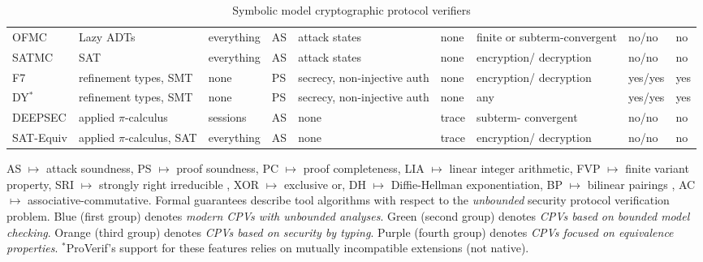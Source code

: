 \begin{table}[h!]
\begin{tabular}{|p{1.3cm}|p{1.8cm}p{1.3cm}p{1.5cm}p{1.4cm}p{.8cm}p{1.9cm}p{1cm}p{1.6cm}|}
\rowcolor{grouptwoLight}
OFMC \cite{ofmc} & Lazy ADTs & everything & AS & attack states & none & finite or subterm-convergent & no/no & no \\

\rowcolor{grouptwoDark}
SATMC \cite{satmc} & SAT & everything & AS & attack states & none & encryption/ decryption & no/no & no \\
\hhline{|=========|}

\rowcolor{groupthreeDark}
F7 \cite{f7} & refinement types, SMT & none & PS & secrecy, non-injective auth & none & encryption/ decryption & yes/yes & yes \\

\rowcolor{groupthreeLight}
DY$^*$ \cite{dystar} & refinement types, SMT & none & PS & secrecy, non-injective auth & none & any & yes/yes & yes \\
\hhline{|=========|}

\rowcolor{groupfourDark}
DEEPSEC \cite{deepsec} & applied \newline$\pi$-calculus & sessions & AS & none & trace & subterm- \newline convergent & no/no & no \\

\rowcolor{groupfourLight}
SAT-Equiv \cite{sat_equiv} & applied \newline$\pi$-calculus, SAT & everything & AS & none & trace & encryption/ decryption & no/no & no \\

\hline
\end{tabular}
\begin{flushleft}
\vspace{.3em}
AS $\mapsto$ attack soundness, PS $\mapsto$ proof soundness, PC $\mapsto$ proof completeness, LIA $\mapsto$ linear integer arithmetic,
FVP $\mapsto$ finite variant property, SRI $\mapsto$ strongly right irreducible \cite{rewrite_systems}, XOR $\mapsto$ exclusive or, DH $\mapsto$ Diffie-Hellman exponentiation, BP $\mapsto$ bilinear pairings \cite{bilinear}, AC $\mapsto$ associative-commutative.
\newline\newline 
Formal guarantees describe tool algorithms with respect to the \emph{unbounded} security protocol verification problem. 
\newline\newline
Blue (first group) denotes \emph{modern CPVs with unbounded analyses}. Green (second group) denotes \emph{CPVs based on bounded model checking}. Orange (third group) denotes \emph{CPVs based on security by typing}. Purple (fourth group) denotes \emph{CPVs focused on equivalence properties}.
\newline\newline
$^*$ProVerif's support for these features relies on mutually incompatible extensions (not native).
\end{flushleft}

\caption{Symbolic model cryptographic protocol verifiers}
\label{tab:tools}
\end{table}

